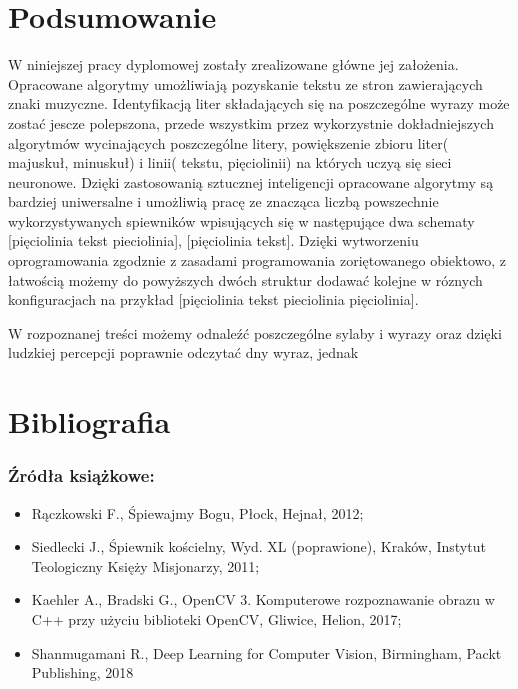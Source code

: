 \documentclass[a4paper,12pt]{article}
\begin{document}
	   \newpage  
	   \section{Podsumowanie}
	   \par W niniejszej pracy dyplomowej zostały zrealizowane główne jej założenia. Opracowane algorytmy umożliwiają pozyskanie tekstu ze stron zawierających znaki muzyczne. Identyfikacją liter składających się na poszczególne wyrazy może zostać jescze polepszona, przede wszystkim przez wykorzystnie dokładniejszych algorytmów wycinających poszczególne litery, powiększenie zbioru liter( majuskuł, minuskuł) i linii( tekstu, pięciolinii) na których uczyą się sieci neuronowe. Dzięki zastosowanią sztucznej inteligencji opracowane algorytmy są bardziej uniwersalne i umożliwią pracę ze znacząca liczbą powszechnie wykorzystywanych spiewników wpisujących się w następujące dwa schematy [pięciolinia tekst pieciolinia], [pięciolinia tekst]. Dzięki wytworzeniu oprogramowania zgodznie z zasadami programowania zoriętowanego obiektowo, z łatwością możemy do powyższych dwóch struktur dodawać kolejne w róznych konfiguracjach na przykład [pięciolinia tekst pieciolinia pięciolinia]. 
	   
	   
	   
	   \par 
	   
	   
	   
	   W rozpoznanej treści możemy odnaleźć poszczególne sylaby i wyrazy oraz dzięki ludzkiej percepcji poprawnie odczytać dny wyraz, jednak 
	   
	   \newpage
	   \section{Bibliografia}
	   \subsubsection*{Źródła książkowe:}
	   \begin{spacing}{1.5}
	   \begin{itemize}
	        \item Rączkowski F., Śpiewajmy Bogu, Płock, Hejnał, 2012;
	        \item Siedlecki J., Śpiewnik kościelny, Wyd. XL (poprawione), Kraków,
	        Instytut Teologiczny Księży Misjonarzy, 2011;
	        \item Kaehler A., Bradski G., OpenCV 3. Komputerowe rozpoznawanie obrazu w C++ przy użyciu biblioteki OpenCV, Gliwice, Helion, 2017;
	        \item Shanmugamani R., Deep Learning for Computer Vision, Birmingham, Packt Publishing, 2018
	   \end{itemize}
	   \end{spacing}
	   
\end{document}
